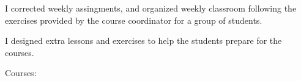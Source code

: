 
I corrected weekly assingments, and organized weekly classroom following the
exercises provided by the course coordinator for a group of students.

\medskip

I designed extra lessons and exercises to help the students prepare for the
courses.

\medskip

Courses:
 
